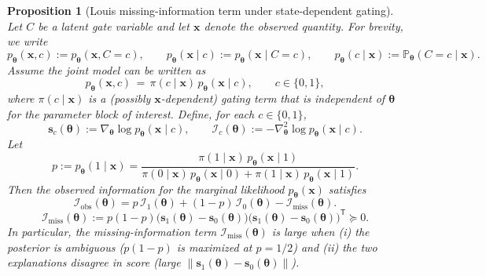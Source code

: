 \documentclass[10pt,a4paper]{amsart}
\newtheorem{proposition}{Proposition}
\newcommand{\Imiss}{\bm{\mathcal{I}}_{\mathrm{miss}}}
\newcommand{\Io}{\bm{\mathcal{I}}_{\mathrm{obs}}}
\begin{document}
\begin{proposition}[Louis missing-information term under state-dependent gating]
\label{prop:s:louis_missing_state_dependent_gate}
Let $C$ be a latent gate variable and let $\bm{x}$ denote the observed quantity.
For brevity, we write
\begin{equation}
p_{\bm\theta}(\bm x,c):=p_{\bm\theta}(\bm x, C{=}c),\qquad
p_{\bm\theta}(\bm x\mid c):=p_{\bm\theta}(\bm x\mid C{=}c),\qquad
p_{\bm\theta}(c\mid \bm x):=\mathbb{P}_{\bm\theta}(C{=}c\mid \bm x).
\end{equation}
Assume the joint model can be written as
\begin{equation}
p_{\bm\theta}(\bm x,c) \,=\, \pi(c\mid \bm x)\,p_{\bm\theta}(\bm x\mid c),\qquad c\in\{0,1\},
\end{equation}
where $\pi(c\mid \bm x)$ is a (possibly $\bm x$-dependent) gating term that is \emph{independent of $\bm\theta$} for the parameter block of interest.
Define, for each $c\in\{0,1\}$,
\begin{equation}
\bm s_c(\bm\theta) := \nabla_{\bm\theta}\log p_{\bm\theta}(\bm x\mid c),
\qquad
\bm{\mathcal I}_c(\bm\theta) := -\nabla_{\bm\theta}^2\log p_{\bm\theta}(\bm x\mid c).
\end{equation}
Let
\begin{equation}
p := p_{\bm\theta}(1\mid \bm x)
= \frac{\pi(1\mid \bm x)\,p_{\bm\theta}(\bm x\mid 1)}{\pi(0\mid \bm x)\,p_{\bm\theta}(\bm x\mid 0)+\pi(1\mid \bm x)\,p_{\bm\theta}(\bm x\mid 1)}.
\end{equation}
Then the observed information for the marginal likelihood $p_{\bm\theta}(\bm x)$ satisfies
\begin{equation}
\label{eq:s:2switch_state_dependent}
\Io(\bm\theta)
=
p\,\bm{\mathcal{I}}_1(\bm\theta) + (1-p)\,\bm{\mathcal{I}}_0(\bm\theta)
- \Imiss(\bm\theta).
\end{equation}
\begin{equation}
\label{eq:s:2switch_state_dependent_miss}
\Imiss(\bm\theta)
:=
p(1-p)\big(\bm{s}_1(\bm\theta)-\bm{s}_0(\bm\theta)\big)\big(\bm{s}_1(\bm\theta)-\bm{s}_0(\bm\theta)\big)^{\mathsf T}
\succeq 0.
\end{equation}
In particular, the missing-information term $\Imiss(\bm\theta)$ is large when (i) the posterior is ambiguous
($p(1-p)$ is maximized at $p=1/2$) and (ii) the two explanations disagree in score
(large $\|\bm{s}_1(\bm\theta)-\bm{s}_0(\bm\theta)\|$).
\end{proposition}
\end{document}
